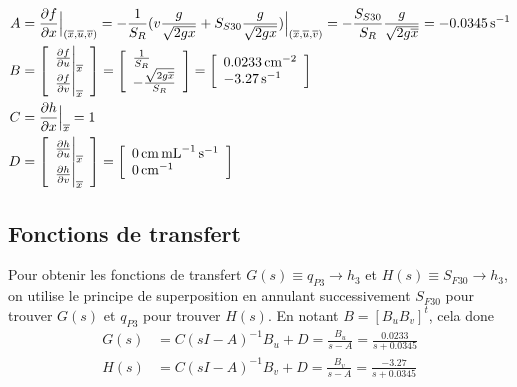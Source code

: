 \documentclass[frenchb, paper=a4, fontsize=11pt]{scrartcl}
\newcommand*\eq[1]{\overline{#1}} 				%
\numberwithin{equation}{section}					%
\numberwithin{figure}{section}					%
\numberwithin{table}{section}						%
\begin{document}
\begin{align*}
	A & = \fpart{f}{x}\Big|_{(\eq{x},\eq{u},\eq{v})} =
	-\frac{1}{S_R}(v\frac{g}{\sqrt{2gx}} + S_{S30}\frac{g}{\sqrt{2gx}})
	\Big|_{(\eq{x},\eq{u},\eq{v})} = -\frac{S_{S30}}{S_R}
	\frac{g}{\sqrt{2g\eq{x}}} = \SI{-0.0345}{\per\second}\\
	B &=	\left[\begin{array}{l}
 			\fpart{f}{u}\Big|_{\eq{x}} \\
  			\fpart{f}{v}\Big|_{\eq{x}} \\
		\end{array} \right] 
	= 	\left[\begin{array}{l}
 			\frac{1}{S_R} \\
  			-\frac{\sqrt{2g\eq{x}}}{S_R}
		\end{array} \right]
	=	\left[\begin{array}{l}
			\SI{0.0233}{\per\centi\meter\squared} \\
			\SI{-3.27}{\per\second}
		\end{array} \right] \\
	C &= \fpart{h}{x}\Big|_{\eq{x}} = 1 \\
	D &= \left[\begin{array}{l}
 			\fpart{h}{u}\Big|_{\eq{x}} \\
  			\fpart{h}{v}\Big|_{\eq{x}}
		\end{array} \right] 
	= 	\left[ \begin{array}{l}
			\SI{0}{\centi\meter\per\milli\liter\per\second} \\
			\SI{0}{\per\centi\meter}
		\end{array} \right]
\end{align*}


\subsection{Fonctions de transfert}
Pour obtenir les fonctions de transfert $G(s) \equiv q_{P3} \to h_3$
et $H(s) \equiv S_{F30} \to h_3$, on utilise le principe de superposition
en annulant successivement $S_{F30}$ pour trouver $G(s)$ et $q_{P3}$ pour
trouver $H(s)$. En notant $B = [B_u B_v]^t$, cela done
\begin{align}
	G(s) &= C(sI-A)^{-1}B_u + D = \frac{B_u}{s-A}	= \frac{0.0233}{s+0.0345} \\
	H(s) &= C(sI-A)^{-1}B_v + D = \frac{B_v}{s-A} = \frac{-3.27}{s+0.0345}
\end{align}
\end{document}
